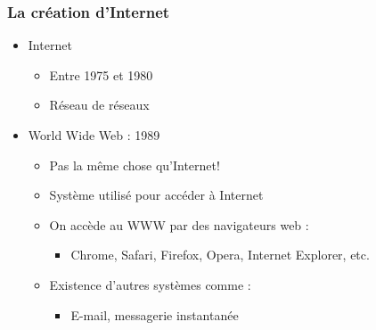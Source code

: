\documentclass{beamer}
\begin{document}
      \begin{frame}
        \frametitle{La création d'Internet}
        \begin{itemize}
          \item<2-> Internet
            \begin{itemize}
              \item Entre 1975 et 1980
              \item Réseau de réseaux
            \end{itemize}
          \item<3-> World Wide Web : 1989
            \begin{itemize}
              \item Pas la même chose qu'Internet!
              \item Système utilisé pour accéder à Internet
              \item On accède au WWW par des navigateurs web :
                \begin{itemize}
                  \item Chrome, Safari, Firefox, Opera, Internet Explorer, etc.
                \end{itemize}
              \item Existence d'autres systèmes comme :
                \begin{itemize}
                  \item E-mail, messagerie instantanée 
                \end{itemize}
            \end{itemize}
        \end{itemize}
      \end{frame}
      
\end{document}
